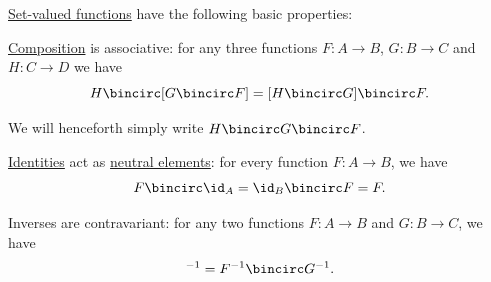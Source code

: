 \begin{proposition}\label{thm:def:set_valued_function}
  \hyperref[def:set_valued_function]{Set-valued functions} have the following basic properties:

  \begin{thmenum}
     \hyperref[def:set_valued_function/composition]{Composition} is associative: for any three functions \( F: A \to B \), \( G: B \to C \) and \( H: C \to D \) we have
    \begin{equation*}
      H \bincirc [G \bincirc F] = [H \bincirc G] \bincirc F.
    \end{equation*}

    We will henceforth simply write \( H \bincirc G \bincirc F \).

     \hyperref[def:set_valued_function/identity]{Identities} act as \hyperref[def:semigroup_neutral_element]{neutral elements}: for every function \( F: A \to B \), we have
    \begin{equation*}
      F \bincirc \id_A = \id_B \bincirc F = F.
    \end{equation*}

     Inverses are contravariant: for any two functions \( F: A \to B \) and \( G: B \to C \), we have
    \begin{equation*}
      [G \bincirc F]^{-1} = F^{-1} \bincirc G^{-1}.
    \end{equation*}
  \end{thmenum}
\end{proposition}

